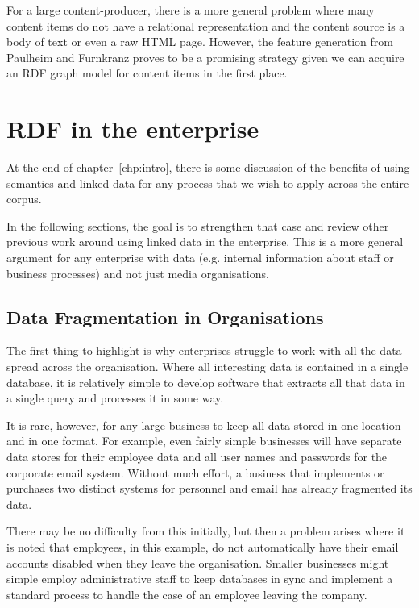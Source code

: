 For a large content-producer, there is a more general problem where many content
items do not have a relational representation and the content source is a body
of text or even a raw HTML page. However, the feature generation from Paulheim
and F\:urnkranz proves to be a promising strategy given we can acquire an RDF
graph model for content items in the first place.

\section{RDF in the enterprise}
\label{sec:linked-enterprise-data}

At the end of chapter~\ref{chp:intro}, there is some discussion of the
benefits of using semantics and linked data for any process that we wish
to apply across the entire corpus.

In the following sections, the goal is to strengthen that case and review other
previous work around using linked data in the enterprise. This is a more
general argument for any enterprise with data (e.g. internal information
about staff or business processes) and not just media organisations.

\subsection{Data Fragmentation in Organisations}

The first thing to highlight is why enterprises struggle to work with all
the data spread across the organisation. Where all interesting data is
contained in a single database, it is relatively simple to develop software
that extracts all that data in a single query and processes it in some way.

It is rare, however, for any large business to keep all data stored in
one location and in one format. For example, even fairly simple businesses will have
separate data stores for their employee data and all
user names and passwords for the corporate email system. Without much effort,
a business that implements or purchases two distinct systems for personnel
and email has already fragmented its data.

There may be no difficulty from this initially, but then a problem arises
where it is noted that employees, in this example, do not automatically have
their email accounts disabled when they leave the organisation. Smaller
businesses might simple employ administrative staff to keep databases in
sync and implement a standard process to handle the case of an employee
leaving the company.

